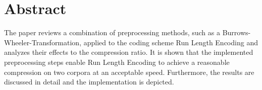 \chapter*{Abstract}
The paper reviews a combination of preprocessing methods, such as a Burrows-Wheeler-Transformation, applied to the coding scheme Run Length Encoding and analyzes their effects to the compression ratio. It is shown that the implemented preprocessing steps enable Run Length Encoding to achieve a reasonable compression on two corpora at an acceptable speed. Furthermore, the results are discussed in detail and the implementation is depicted.